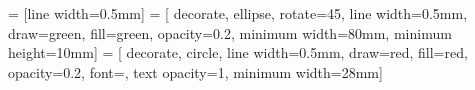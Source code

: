 
 = [line width=0.5mm]
 = [
    decorate, ellipse, rotate=45, line width=0.5mm, draw=green,
    fill=green, opacity=0.2,
    minimum width=80mm, minimum height=10mm]
 = [
    decorate, circle, line width=0.5mm, draw=red,
    fill=red, opacity=0.2, font=\small, text opacity=1,
    minimum width=28mm]

\begin{center}
    \HumorSans
\end{center}

